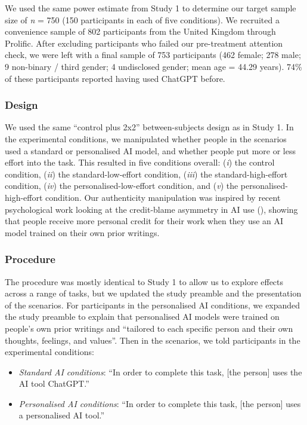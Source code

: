 \documentclass[
  man,
  floatsintext,
  longtable,
  nolmodern,
  notxfonts,
  notimes,
  colorlinks=true,linkcolor=blue,citecolor=blue,urlcolor=blue]{apa7}
\providecommand{\tightlist}{%
  \setlength{\itemsep}{0pt}\setlength{\parskip}{0pt}}
\begin{document}
We used the same power estimate from Study 1 to determine our target
sample size of \emph{n} = 750 (150 participants in each of five
conditions). We recruited a convenience sample of 802 participants from
the United Kingdom through Prolific. After excluding participants who
failed our pre-treatment attention check, we were left with a final
sample of 753 participants (462 female; 278 male; 9 non-binary / third
gender; 4 undisclosed gender; mean age = 44.29 years). 74\% of these
participants reported having used ChatGPT before.

\subsubsection*{Design}\label{design-2}

We used the same ``control plus 2x2'' between-subjects design as in
Study 1. In the experimental conditions, we manipulated whether people
in the scenarios used a standard or personalised AI model, and whether
people put more or less effort into the task. This resulted in five
conditions overall: (\emph{i}) the control condition, (\emph{ii}) the
standard-low-effort condition, (\emph{iii}) the standard-high-effort
condition, (\emph{iv}) the personalised-low-effort condition, and
(\emph{v}) the personalised-high-effort condition. Our authenticity
manipulation was inspired by recent psychological work looking at the
credit-blame asymmetry in AI use (), showing that people receive more personal credit for their work
when they use an AI model trained on their own prior writings.

\subsubsection*{Procedure}\label{procedure-2}

The procedure was mostly identical to Study 1 to allow us to explore
effects across a range of tasks, but we updated the study preamble and
the presentation of the scenarios. For participants in the personalised
AI conditions, we expanded the study preamble to explain that
personalised AI models were trained on people's own prior writings and
``tailored to each specific person and their own thoughts, feelings, and
values''. Then in the scenarios, we told participants in the
experimental conditions:

\begin{itemize}
\tightlist
\item
  \emph{Standard AI conditions}: ``In order to complete this task,
  {[}the person{]} uses the AI tool ChatGPT.''
\item
  \emph{Personalised AI conditions}: ``In order to complete this task,
  {[}the person{]} uses a personalised AI tool.''
\end{itemize}
\end{document}
